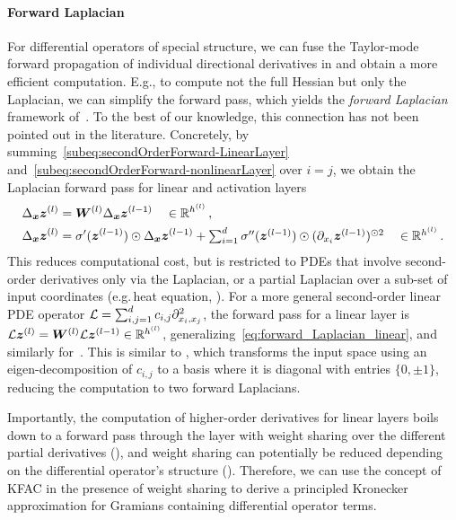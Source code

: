 \paragraph{Forward Laplacian} For differential operators of special structure, we can fuse the Taylor-mode forward propagation of individual directional derivatives in  and obtain a more efficient computation.
E.g., to compute not the full Hessian but only the Laplacian, we can simplify the forward pass, which yields the \emph{forward Laplacian} framework of~\citet{li2023forward}.
To the best of our knowledge, this connection has not been pointed out in the literature.
Concretely, by summing~\eqref{subeq:secondOrderForward-LinearLayer} and~\eqref{subeq:secondOrderForward-nonlinearLayer} over $i=j$, we obtain the Laplacian forward pass for linear and activation layers
\begin{subequations}\label{eq:forward-laplacian-main}
  \begin{align}
    \label{eq:forward_Laplacian_linear}
    \Delta_{\bm{x}}{\bm{z}}^{(l)}
    &=
      {\bm{W}}^{(l)}\Delta_{\bm{x}}{\bm{z}}^{(l-1)}
      \quad \in {\mathbb{R}}^{h^{(l)}}\,,
    \\
    \label{eq:forward_Laplacian_nonlinear}
    \Delta_{\bm{x}}{\bm{z}}^{(l)}
    &=
      \sigma'({\bm{z}}^{(l-1)})\odot\Delta_{\bm{x}}{\bm{z}}^{(l-1)}
      +
      \textstyle
      \sum_{i=1}^d \sigma''({\bm{z}}^{(l-1)})\odot (\partial_{x_i}{{\bm{z}}^{(l-1)}})^{\odot 2}
      \quad \in {\mathbb{R}}^{h^{(l)}}\,.
  \end{align}
\end{subequations}
This reduces computational cost, but is restricted to PDEs that involve second-order derivatives only via the Laplacian, or a partial Laplacian over a sub-set of input coordinates (e.g.\,heat equation, ).
For a more general second-order linear PDE operator ${\mathcal{L}} = \sum_{i,j=1}^d c_{i,j} \partial^2_{{x}_i,{x}_j}$, the forward pass for a linear layer is $\mathcal{L} {\bm{z}}^{(l)} = {\bm{W}}^{(l)}\mathcal{L} {\bm{z}}^{(l-1)} \in {\mathbb{R}}^{h^{(l)}}$, generalizing~\eqref{eq:forward_Laplacian_linear}, and similarly for~.
This is similar to \cite{li2024dof}, which transforms the input space using an eigen-decomposition of $c_{i,j}$ to a basis where it is diagonal with entries $\{0, \pm 1\}$, reducing the computation to two forward Laplacians.

Importantly, the computation of higher-order derivatives for linear layers boils down to a forward pass through the layer with weight sharing over the different partial derivatives (), and weight sharing can potentially be reduced depending on the differential operator's structure ().
Therefore, we can use the concept of KFAC in the presence of weight sharing to derive a principled Kronecker approximation for Gramians containing differential operator terms.

